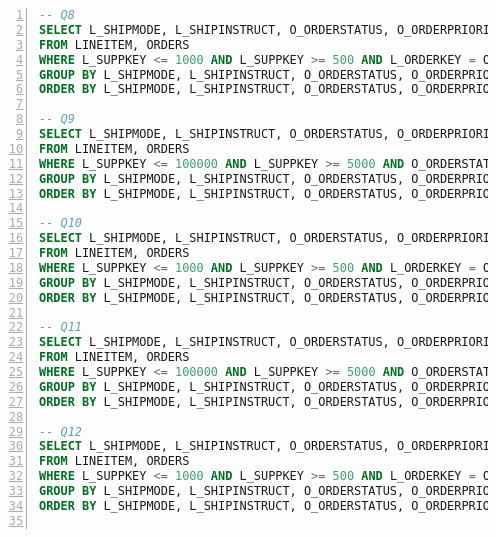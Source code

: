 \begin{lstlisting}[language=sql,numbers=left,xleftmargin=2em,multicols=2,basicstyle=\ttfamily\tiny]
-- Q8
SELECT L_SHIPMODE, L_SHIPINSTRUCT, O_ORDERSTATUS, O_ORDERPRIORITY, SUM(L_QUANTITY), AVG(L_QUANTITY), SUM(L_QUANTITY - L_EXTENDEDPRICE), SUM(L_QUANTITY * L_EXTENDEDPRICE - 1), SUM(O_TOTALPRICE), AVG(O_SHIPPRIORITY), COUNT(*)
FROM LINEITEM, ORDERS
WHERE L_SUPPKEY <= 1000 AND L_SUPPKEY >= 500 AND L_ORDERKEY = O_ORDERKEY
GROUP BY L_SHIPMODE, L_SHIPINSTRUCT, O_ORDERSTATUS, O_ORDERPRIORITY
ORDER BY L_SHIPMODE, L_SHIPINSTRUCT, O_ORDERSTATUS, O_ORDERPRIORITY;

-- Q9
SELECT L_SHIPMODE, L_SHIPINSTRUCT, O_ORDERSTATUS, O_ORDERPRIORITY, SUM(L_QUANTITY), AVG(L_QUANTITY), SUM(L_QUANTITY - L_EXTENDEDPRICE), SUM(L_QUANTITY * L_EXTENDEDPRICE - 1), SUM(O_TOTALPRICE), AVG(O_SHIPPRIORITY), COUNT(*)
FROM LINEITEM, ORDERS
WHERE L_SUPPKEY <= 100000 AND L_SUPPKEY >= 5000 AND O_ORDERSTATUS = 'P' AND L_ORDERKEY = O_ORDERKEY
GROUP BY L_SHIPMODE, L_SHIPINSTRUCT, O_ORDERSTATUS, O_ORDERPRIORITY
ORDER BY L_SHIPMODE, L_SHIPINSTRUCT, O_ORDERSTATUS, O_ORDERPRIORITY;

-- Q10
SELECT L_SHIPMODE, L_SHIPINSTRUCT, O_ORDERSTATUS, O_ORDERPRIORITY, SUM(L_QUANTITY), AVG(L_QUANTITY), SUM(L_QUANTITY - L_EXTENDEDPRICE), SUM(L_QUANTITY * L_EXTENDEDPRICE - 1), AVG(L_DISCOUNT * (L_TAX +1)), AVG(L_QUANTITY / (L_TAX +1)), SUM(O_TOTALPRICE), AVG(O_SHIPPRIORITY), SUM(O_TOTALPRICE - L_EXTENDEDPRICE), AVG(O_SHIPPRIORITY * L_EXTENDEDPRICE - 1), COUNT(*)
FROM LINEITEM, ORDERS
WHERE L_SUPPKEY <= 1000 AND L_SUPPKEY >= 500 AND L_ORDERKEY = O_ORDERKEY
GROUP BY L_SHIPMODE, L_SHIPINSTRUCT, O_ORDERSTATUS, O_ORDERPRIORITY
ORDER BY L_SHIPMODE, L_SHIPINSTRUCT, O_ORDERSTATUS, O_ORDERPRIORITY;

-- Q11
SELECT L_SHIPMODE, L_SHIPINSTRUCT, O_ORDERSTATUS, O_ORDERPRIORITY, SUM(L_QUANTITY), AVG(L_QUANTITY), SUM(L_QUANTITY - L_EXTENDEDPRICE), SUM(L_QUANTITY * L_EXTENDEDPRICE - 1), AVG(L_DISCOUNT * (L_TAX +1)), AVG(L_QUANTITY / (L_TAX +1)), SUM(O_TOTALPRICE), AVG(O_SHIPPRIORITY), SUM(O_TOTALPRICE - L_EXTENDEDPRICE), AVG(O_SHIPPRIORITY * L_EXTENDEDPRICE - 1), COUNT(*)
FROM LINEITEM, ORDERS
WHERE L_SUPPKEY <= 100000 AND L_SUPPKEY >= 5000 AND O_ORDERSTATUS = 'P' AND L_ORDERKEY = O_ORDERKEY
GROUP BY L_SHIPMODE, L_SHIPINSTRUCT, O_ORDERSTATUS, O_ORDERPRIORITY
ORDER BY L_SHIPMODE, L_SHIPINSTRUCT, O_ORDERSTATUS, O_ORDERPRIORITY;

-- Q12
SELECT L_SHIPMODE, L_SHIPINSTRUCT, O_ORDERSTATUS, O_ORDERPRIORITY, SUM(L_QUANTITY), AVG(L_QUANTITY), SUM(L_QUANTITY - L_EXTENDEDPRICE), SUM(L_QUANTITY * L_EXTENDEDPRICE - 1), AVG(L_DISCOUNT * (L_TAX +1)), AVG(L_QUANTITY / (L_TAX +1)), SUM(L_TAX)/SUM(L_EXTENDEDPRICE), SUM(L_QUANTITY * 0.5), AVG(L_QUANTITY * 0.2), SUM(O_TOTALPRICE), AVG(O_SHIPPRIORITY), SUM(O_TOTALPRICE - L_EXTENDEDPRICE), AVG(O_SHIPPRIORITY * L_EXTENDEDPRICE - 1), SUM(O_SHIPPRIORITY)/SUM(O_TOTALPRICE), COUNT(*)
FROM LINEITEM, ORDERS
WHERE L_SUPPKEY <= 1000 AND L_SUPPKEY >= 500 AND L_ORDERKEY = O_ORDERKEY
GROUP BY L_SHIPMODE, L_SHIPINSTRUCT, O_ORDERSTATUS, O_ORDERPRIORITY
ORDER BY L_SHIPMODE, L_SHIPINSTRUCT, O_ORDERSTATUS, O_ORDERPRIORITY;


\end{lstlisting}
